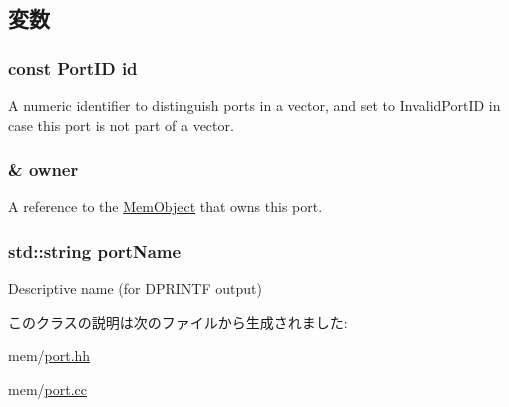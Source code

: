 \subsection{変数}
\hypertarget{classPort_a0a67444fc1c33a60fe4a92bfff05d0cb}{
\subsubsection[{id}]{\setlength{\rightskip}{0pt plus 5cm}const {\bf PortID} {\bf id}}}
\label{classPort_a0a67444fc1c33a60fe4a92bfff05d0cb}
A numeric identifier to distinguish ports in a vector, and set to InvalidPortID in case this port is not part of a vector. \hypertarget{classPort_aba966efb6c1df4b015be3a396df6c318}{
\subsubsection[{owner}]{\& {\bf owner}}}
\label{classPort_aba966efb6c1df4b015be3a396df6c318}
A reference to the \hyperlink{classMemObject}{MemObject} that owns this port. \hypertarget{classPort_a3ba70989fe75b76393da3cbc6bdcf196}{
\subsubsection[{portName}]{\setlength{\rightskip}{0pt plus 5cm}std::string {\bf portName}}}
\label{classPort_a3ba70989fe75b76393da3cbc6bdcf196}
Descriptive name (for DPRINTF output) 

このクラスの説明は次のファイルから生成されました:\begin{DoxyCompactItemize}
\item 
mem/\hyperlink{port_8hh}{port.hh}\item 
mem/\hyperlink{port_8cc}{port.cc}\end{DoxyCompactItemize}
